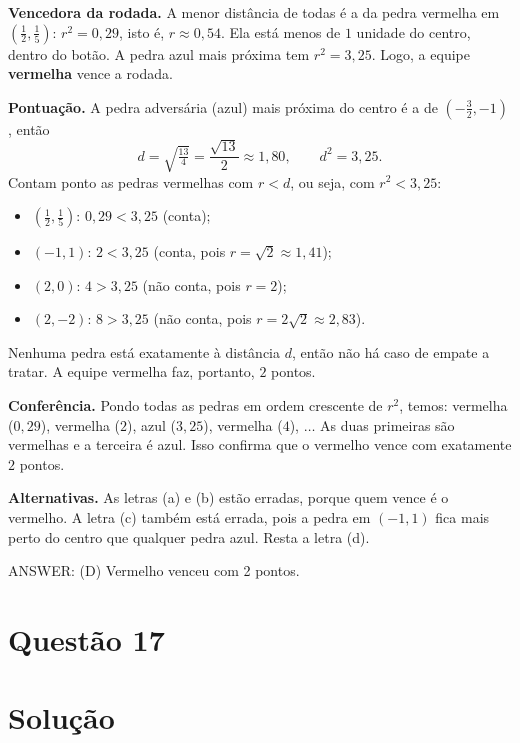 \documentclass{article}%
\begin{document}
\textbf{Vencedora da rodada.} A menor distância de todas é a da pedra vermelha em $\left(\tfrac{1}{2},\tfrac{1}{5}\right)$: $r^2=0{,}29$, isto é, $r\approx 0{,}54$. Ela está menos de $1$ unidade do centro, dentro do botão. A pedra azul mais próxima tem $r^2=3{,}25$. Logo, a equipe \textbf{vermelha} vence a rodada.

\textbf{Pontuação.} A pedra adversária (azul) mais próxima do centro é a de $\left(-\tfrac{3}{2},-1\right)$, então
\[
d=\sqrt{\tfrac{13}{4}}=\frac{\sqrt{13}}{2}\approx 1{,}80,\qquad d^2=3{,}25 .
\]
Contam ponto as pedras vermelhas com $r<d$, ou seja, com $r^2<3{,}25$:
\begin{itemize}
\item $\left(\tfrac{1}{2},\tfrac{1}{5}\right)$: $0{,}29<3{,}25$ \quad (conta);
\item $(-1,1)$: $2<3{,}25$ \quad (conta, pois $r=\sqrt{2}\approx 1{,}41$);
\item $(2,0)$: $4>3{,}25$ \quad (não conta, pois $r=2$);
\item $(2,-2)$: $8>3{,}25$ \quad (não conta, pois $r=2\sqrt{2}\approx 2{,}83$).
\end{itemize}
Nenhuma pedra está exatamente à distância $d$, então não há caso de empate a tratar. A equipe vermelha faz, portanto, $2$ pontos.

\textbf{Conferência.} Pondo todas as pedras em ordem crescente de $r^2$, temos: vermelha ($0{,}29$), vermelha ($2$), azul ($3{,}25$), vermelha ($4$), $\ldots$ As duas primeiras são vermelhas e a terceira é azul. Isso confirma que o vermelho vence com exatamente $2$ pontos.

\textbf{Alternativas.} As letras (a) e (b) estão erradas, porque quem vence é o vermelho. A letra (c) também está errada, pois a pedra em $(-1,1)$ fica mais perto do centro que qualquer pedra azul. Resta a letra (d).

ANSWER: (D) Vermelho venceu com 2 pontos.%
\newpage%
\section*{Questão 17}

\section*{Solução}
\end{document}
